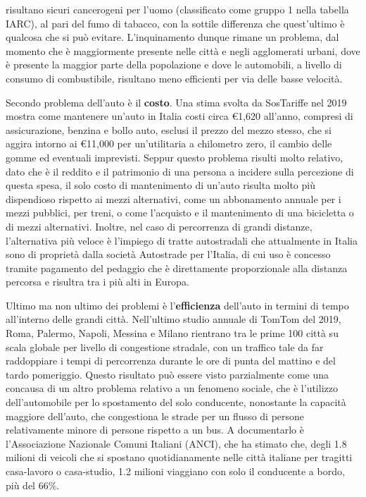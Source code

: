 risultano sicuri cancerogeni per l'uomo (classificato come gruppo 1 nella tabella IARC), al pari del fumo di tabacco, con la sottile differenza che quest'ultimo è qualcosa che si può evitare\cite{iarctable}. L'inquinamento dunque rimane un problema, dal momento che è maggiormente presente nelle città e negli agglomerati urbani, dove è presente la maggior parte della popolazione e dove le automobili, a livello di consumo di combustibile, risultano meno efficienti per via delle basse velocità.

Secondo problema dell'auto è il \textbf{costo}. Una stima svolta da SosTariffe nel 2019 mostra come mantenere un'auto in Italia costi circa €1,620 all'anno, compresi di assicurazione, benzina e bollo auto, esclusi il prezzo del mezzo stesso, che si aggira intorno ai €11,000 per un'utilitaria a chilometro zero, il cambio delle gomme ed eventuali imprevisti\cite{sostariffe}. Seppur questo problema risulti molto relativo, dato che è il reddito e il patrimonio di una persona a incidere sulla percezione di questa spesa, il solo costo di mantenimento di un'auto risulta molto più dispendioso rispetto ai mezzi alternativi, come un abbonamento annuale per i mezzi pubblici, per treni, o come l'acquisto e il mantenimento di una bicicletta o di mezzi alternativi. Inoltre, nel caso di percorrenza di grandi distanze, l'alternativa più veloce è l'impiego di tratte autostradali che attualmente in Italia sono di proprietà dalla società Autostrade per l'Italia, di cui uso è concesso tramite pagamento del pedaggio che è direttamente proporzionale alla distanza percorsa e risultra tra i più alti in Europa.

Ultimo ma non ultimo dei problemi è l'\textbf{efficienza} dell'auto in termini di tempo all'interno delle grandi città. Nell'ultimo studio annuale di TomTom del 2019\cite{tomtomindexmilan}, Roma, Palermo, Napoli, Messina e Milano rientrano tra le prime 100 città su scala globale per livello di congestione stradale, con un traffico tale da far raddoppiare i tempi di percorrenza durante le ore di punta del mattino e del tardo pomeriggio. Questo risultato può essere visto parzialmente come una concausa di un altro problema relativo a un fenomeno sociale, che è l'utilizzo dell'automobile per lo spostamento del solo conducente, nonostante la capacità maggiore dell'auto, che congestiona le strade per un flusso di persone relativamente minore di persone rispetto a un bus. A documentarlo è l'Associazione Nazionale Comuni Italiani (ANCI), che ha stimato che, degli 1.8 milioni di veicoli che si spostano quotidianamente nelle città italiane per tragitti casa-lavoro o casa-studio, 1.2 milioni viaggiano con solo il conducente a bordo\cite{anciperrepubblica}, più del 66\%.

